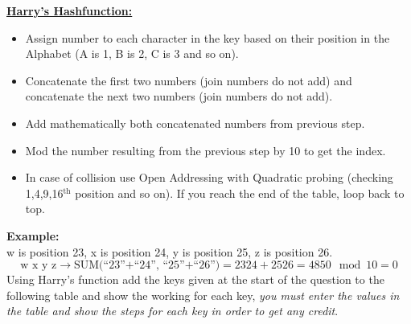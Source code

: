 \documentclass{article}
\begin{document}
	\textbf{\underline{Harry's Hashfunction:}}
	\begin{itemize}
		\item Assign number to each character in the key based on their position in the Alphabet (A is 1, B is 2, C is 3 and so on).
		\item Concatenate the first two numbers (join numbers do not add) and concatenate the next two numbers (join numbers do not add).
		\item Add mathematically both concatenated numbers from previous step.
		\item Mod the number resulting from the previous step by 10 to get the index.
		\item In case of collision use Open Addressing with Quadratic probing (checking 1,4,9,16$^{\text{th}}$ position and so on). If you reach the end of the table, loop back to top.
	\end{itemize}
	\textbf{Example:}\\
	w is position 23, x is position 24, y is position 25, z is position 26.
	$$\text{w x y z} \to \text{SUM(``23''+``24'', ``25''+``26'')} = 2324 + 2526 = 4850 \mod 10 = 0$$
	Using Harry’s function add the keys given at the start of the question to the following table and show the working for each key, \textit{you must enter the values in the table and show the steps for each key in order to get any credit}.
\end{document}
